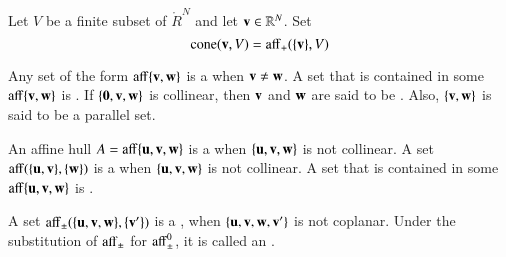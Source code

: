 \begin{definition}[cone]
Let $V$ be a finite subset of
$\ring{R}^N$ and let ${\mathbf v}\in\mathbb{R}^N$. Set
\[ 
{\operatorname{cone}}({\mathbf v},V) = {\operatorname{aff}}_+(\{{\mathbf v}\},V)
\] 
%
%
\end{definition}




	
\begin{definition}
  Any set of the form ${\operatorname{aff}}\{{\mathbf v},{\mathbf w}\}$ is a  when
  ${\mathbf v}\ne {\mathbf w}$.  A set that is contained in some $\operatorname{aff}\{{\mathbf v},{\mathbf w}\}$ is
  .  If $\{{\mathbf 0},{\mathbf v},{\mathbf w}\}$ is collinear, then
  ${\mathbf v}$ and ${\mathbf w}$ are said to be . Also, $\{{\mathbf v},{\mathbf w}\}$
  is said to be a parallel set.
\end{definition}
%
%

\begin{definition}\label{def:plane}
  An affine hull $A={\operatorname{aff}}\{{\mathbf u},{\mathbf v},{\mathbf w}\}$ is a  when
  $\{{\mathbf u},{\mathbf v},{\mathbf w}\}$ is not collinear.  A set ${\operatorname{aff}}(\{{\mathbf u},{\mathbf v}\},\{{\mathbf w}\})$
  is a  when $\{{\mathbf u},{\mathbf v},{\mathbf w}\}$ is not collinear. A
  set that is contained in some $\operatorname{aff}\{{\mathbf u},{\mathbf v},{\mathbf w}\}$ is .
\end{definition}
%
%
%
%


\begin{definition} 
A set
  ${\operatorname{aff}}_{\pm}(\{{\mathbf u},{\mathbf v},{\mathbf w}\},\{{\mathbf v}'\})$ is a ,
  when $\{{\mathbf u},{\mathbf v},{\mathbf w},{\mathbf v}'\}$ is not coplanar.  Under the substitution of
  ${\operatorname{aff}}_{\pm}$ for ${\operatorname{aff}}_{\pm}^0$, it is called an
  .
\end{definition}
%
%

